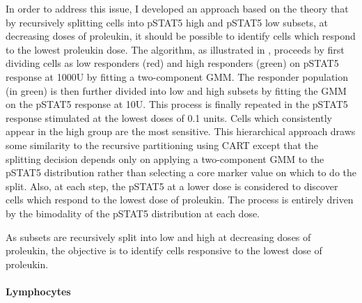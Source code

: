 In order to address this issue, I developed an approach based on the theory that by recursively splitting cells
into pSTAT5 high and pSTAT5 low subsets, at decreasing doses of proleukin,
it should be possible to identify cells which respond to the lowest proleukin dose.
The algorithm, as illustrated in , proceeds by first dividing cells as low responders (red) and high responders (green)
on pSTAT5 response at 1000U by fitting a two-component \gls{GMM}.
The responder population (in green) is then further divided into low and high subsets by fitting the \gls{GMM} on the pSTAT5 response at 10U.
This process is finally repeated in the pSTAT5 response stimulated at the lowest doses of 0.1 units.
Cells which consistently appear in the high group are the most sensitive.
This hierarchical approach draws some similarity to the recursive partitioning using \gls{CART} except that the splitting decision depends only
on applying a two-component \gls{GMM} to the pSTAT5 distribution rather than selecting a core marker value on which to do the split.
Also, at each step, the pSTAT5 at a lower dose is considered to discover cells which respond to the lowest dose of proleukin.
The process is entirely driven by the bimodality of the pSTAT5 distribution at each dose.

As subsets are recursively split into low and high at decreasing doses of proleukin, the objective is to identify cells responsive to the lowest dose of proleukin.

\paragraph{Lymphocytes}


